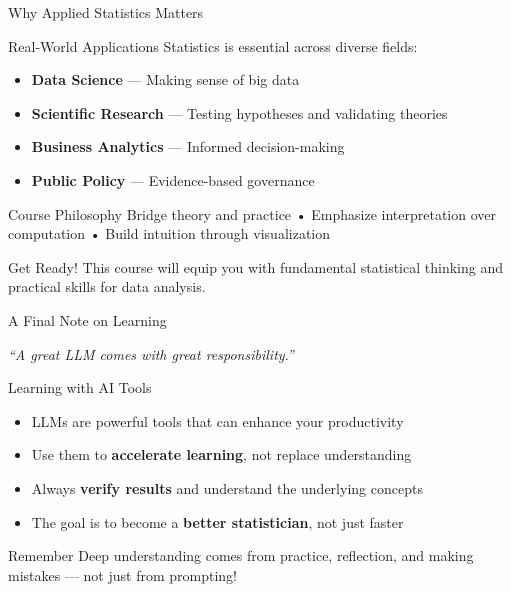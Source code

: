 \documentclass{beamer}
\begin{document}
\begin{frame}{Why Applied Statistics Matters}
  \begin{block}{Real-World Applications}
    Statistics is essential across diverse fields:
    \begin{itemize}
      \item \textbf{Data Science} — Making sense of big data
      \item \textbf{Scientific Research} — Testing hypotheses and validating theories
      \item \textbf{Business Analytics} — Informed decision-making
      \item \textbf{Public Policy} — Evidence-based governance
    \end{itemize}
  \end{block}

  \begin{block}{Course Philosophy}
    Bridge theory and practice • Emphasize interpretation over computation • Build intuition through visualization
  \end{block}

  \begin{alertblock}{Get Ready!}
    This course will equip you with fundamental statistical thinking and practical skills for data analysis.
  \end{alertblock}
\end{frame}

\begin{frame}{A Final Note on Learning}
  \begin{center}
    \Large
    \textit{``A great LLM comes with great responsibility.''}
  \end{center}

  \vspace{1em}

  \begin{block}{Learning with AI Tools}
    \begin{itemize}
      \item LLMs are powerful tools that can enhance your productivity
      \item Use them to \textbf{accelerate learning}, not replace understanding
      \item Always \textbf{verify results} and understand the underlying concepts
      \item The goal is to become a \textbf{better statistician}, not just faster
    \end{itemize}
  \end{block}

  \begin{alertblock}{Remember}
    Deep understanding comes from practice, reflection, and making mistakes — not just from prompting!
  \end{alertblock}
\end{frame}
\end{document}
